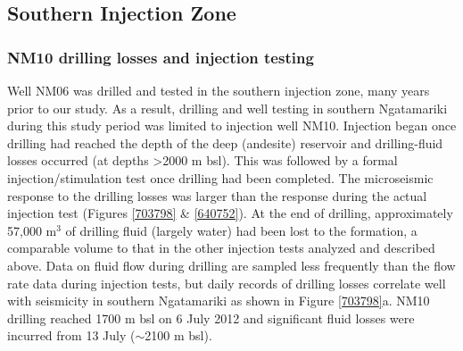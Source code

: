 \subsection{Southern Injection Zone}
\subsubsection{NM10 drilling losses and injection testing}
Well NM06 was drilled and tested in the southern injection zone, many years prior to our study. As a result, drilling and well testing in southern Ngatamariki during this study period was limited to injection well NM10. Injection began once drilling had reached the depth of the deep (andesite) reservoir and drilling-fluid losses occurred (at depths \textgreater2000 m bsl). This was followed by a formal injection\slash{stimulation} test once drilling had been completed. The microseismic response to the drilling losses was larger than the response during the actual injection test (Figures \ref{703798} \& \ref{640752}). At the end of drilling, approximately 57,000 m$^{3}$ of drilling fluid (largely water) had been lost to the formation, a comparable volume to that in the other injection tests analyzed and described above. Data on fluid flow during drilling are sampled less frequently than the flow rate data during injection tests, but daily records of drilling losses correlate well with seismicity in southern Ngatamariki as shown in Figure \ref{703798}a. NM10 drilling reached 1700 m bsl on 6 July 2012 and significant fluid losses were incurred from 13 July ($\sim$2100 m bsl).

